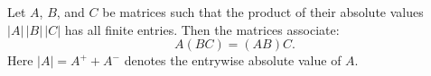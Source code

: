 Let $A$, $B$, and $C$ be matrices such that the product of their absolute values $|A| \, |B| \, |C|$ has all finite entries. Then the matrices associate:
$$A(BC) = (AB)C.$$
Here $|A| = A^+ + A^-$ denotes the entrywise absolute value of $A$.
